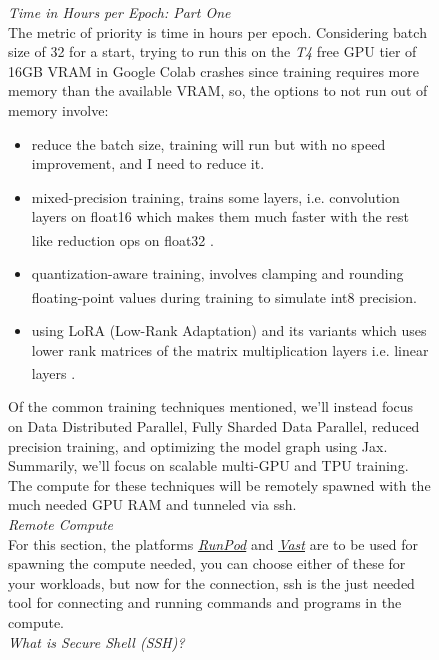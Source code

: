 \documentclass[12pt]{article}
\newcommand{\customtext}[3]{%
    \vspace{#2} %
    \fontsize{13}{8}\textcolor{#1}{\textit{#3}}%
}
\newcommand{\sidecite}[1]{\textsuperscript{\textcolor{blue}{\textbf{\scriptsize#1}}}}
\newcommand{\maincitecount}{\sidecite{\stepcounter{maincite}\themaincite}}
\begin{document}
\begin{figure}[!htb]
    \begin{minipage}[t]{0.65\textwidth}
    \customtext{xtitle}{0em}{Time in Hours per Epoch: Part One}\\
    The metric of priority is time in hours per epoch. Considering batch 
    size of 32 for a start, trying to run this on the {\it T4} free GPU tier 
    of 16GB VRAM in Google Colab crashes since training requires more memory 
    than the available VRAM, so, the options to not run out of memory involve: 
    \begin{itemize}[left=0pt,topsep=0pt,itemsep=0ex,parsep=0ex]
        \item reduce the batch size, training will run but with no speed improvement, 
        and I need to reduce it.
        \item mixed-precision training, trains some layers, i.e. convolution layers 
        on float16 which makes them much faster with the rest like reduction ops on float32
        \maincitecount.
        \item quantization-aware training, involves clamping and rounding floating-point 
        values during training to simulate int8 precision\maincitecount.
        \item using LoRA (Low-Rank Adaptation) and its variants which uses lower rank 
        matrices of the matrix multiplication layers i.e. linear layers \maincitecount. 
    \end{itemize}
Of the common training techniques mentioned, we'll instead focus on 
Data Distributed Parallel, Fully Sharded Data Parallel, reduced precision 
training, and optimizing the model graph using Jax. Summarily, we'll focus on 
scalable multi-GPU and TPU training. The compute for these techniques will 
be remotely spawned with the much needed GPU RAM and tunneled via ssh.
\vspace{1em}\\
\customtext{xtitle}{0em}{Remote Compute}\\
For this section, the platforms {\it \href{https://www.runpod.io}{RunPod}} and 
{\it\href{https://vast.ai}{Vast}} are to be used for spawning the compute needed, 
you can choose either of these for your workloads, but now for the connection, 
ssh is the just needed tool for connecting and running commands and programs in 
the compute.
\vspace{1em}\\
\customtext{xtitle}{0em}{What is Secure Shell (SSH)?}\\

\end{minipage}
\end{figure}
\end{document}
